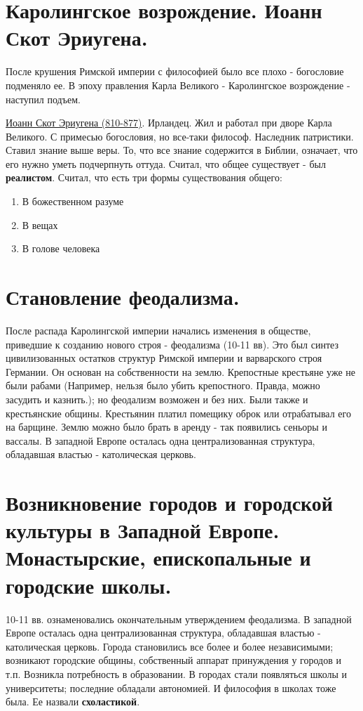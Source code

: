 \documentclass[12pt,a4paper]{article}
\begin{document}
\section{Каролингское возрождение. Иоанн Скот Эриугена.}
После крушения Римской империи с философией было все плохо - богословие подменяло ее. В эпоху правления Карла Великого - Каролингское возрождение - наступил подъем. 

\underline{Иоанн Скот Эриугена (810-877)}. Ирландец. Жил и работал при дворе Карла Великого. С примесью  богословия, но все-таки философ. Наследник патристики. Ставил знание выше веры. То, что все знание содержится в Библии, означает, что его нужно уметь подчерпнуть оттуда. Считал, что общее существует - был \textbf{реалистом}. Считал, что есть три формы существования общего: 
\begin{enumerate}
\item В божественном разуме
\item В вещах
\item В голове человека
\end{enumerate}

\section{Становление феодализма.}
После распада Каролингской империи начались изменения в обществе, приведшие к созданию нового строя - феодализма (10-11 вв). Это был синтез цивилизованных остатков структур Римской империи и варварского строя Германии. 
Он основан на собственности на землю. Крепостные крестьяне уже не были рабами (Например, нельзя было убить крепостного. Правда, можно засудить и казнить.); но феодализм возможен и без них. Были также и крестьянские общины. Крестьянин платил помещику оброк или отрабатывал его на барщине. Землю можно было брать в аренду - так появились сеньоры и вассалы. В западной Европе осталась одна централизованная структура, обладавшая властью - католическая церковь.


\section{Возникновение городов и городской культуры в Западной Европе. Монастырские, епископальные и городские школы.}
10-11 вв. ознаменовались окончательным утверждением феодализма. 
В западной Европе осталась одна централизованная структура, обладавшая властью - католическая церковь.
Города становились все более и более независимыми; возникают городские общины, собственный аппарат принуждения у городов и т.п.
Возникла потребность в образовании. В городах стали появляться школы и университеты; последние обладали автономией. И философия в школах тоже была. Ее назвали \textbf{схоластикой}. 
\end{document}
